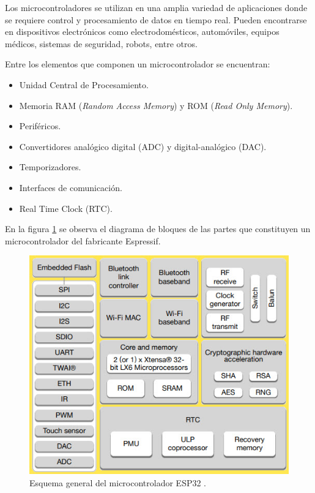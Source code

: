 Los microcontroladores se utilizan en una amplia variedad de aplicaciones donde se requiere control y procesamiento de datos en tiempo real. Pueden encontrarse en dispositivos electrónicos como electrodomésticos, automóviles, equipos médicos, sistemas de seguridad, robots, entre otros.

Entre los elementos que componen un microcontrolador se encuentran:

\begin{itemize}
    \item Unidad Central de Procesamiento.
    \item Memoria RAM (\textit{Random Access Memory}) y ROM (\textit{Read Only Memory}).
    \item Periféricos.
    \item Convertidores analógico digital (ADC) y digital-analógico (DAC).
    \item Temporizadores.
    \item Interfaces de comunicación.
    \item Real Time Clock (RTC).
\end{itemize}

En la figura \ref{fig:ESP32_Block_Diagram} se observa el diagrama de bloques de las partes que constituyen un microcontrolador del fabricante Espressif.

\begin{figure}[H]
    \centering
    \includegraphics[width = \textwidth]{imagenes/cap1_marcoteo/ESP32-Block-Diagram.jpg}
    \caption{Esquema general del microcontrolador ESP32 \citep{datasheetESP32}.}
    \label{fig:ESP32_Block_Diagram}
\end{figure}

